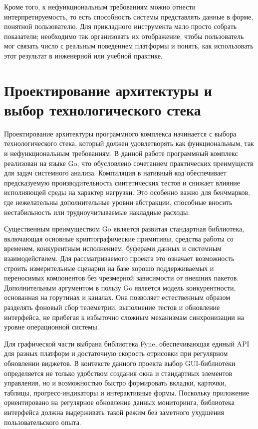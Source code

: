 Кроме того, к нефункциональным требованиям можно отнести интерпретируемость, то есть способность системы представлять данные в форме, понятной пользователю. Для прикладного инструмента мало просто собрать показатели; необходимо так организовать их отображение, чтобы пользователь мог связать число с реальным поведением платформы и понять, как использовать этот результат в инженерной или учебной практике.

\section{Проектирование архитектуры и выбор технологического стека}

Проектирование архитектуры программного комплекса начинается с выбора технологического стека, который должен удовлетворять как функциональным, так и нефункциональным требованиям. В данной работе программный комплекс реализован на языке Go, что обусловлено сочетанием практических преимуществ для задач системного анализа. Компиляция в нативный код обеспечивает предсказуемую производительность синтетических тестов и снижает влияние исполняющей среды на характер нагрузки. Это особенно важно для бенчмарков, где нежелательны дополнительные уровни абстракции, способные вносить нестабильность или трудноучитываемые накладные расходы.

Существенным преимуществом Go является развитая стандартная библиотека, включающая основные криптографические примитивы, средства работы со временем, конкурентным исполнением, буферами данных и системным взаимодействием. Для рассматриваемого проекта это означает возможность строить измерительные сценарии на базе хорошо поддерживаемых и переносимых компонентов без чрезмерной зависимости от внешних пакетов. Дополнительным аргументом в пользу Go является модель конкурентности, основанная на горутинах и каналах. Она позволяет естественным образом разделять фоновый сбор телеметрии, выполнение тестов и обновление интерфейса, не прибегая к избыточно сложным механизмам синхронизации на уровне операционной системы.

Для графической части выбрана библиотека Fyne, обеспечивающая единый API для разных платформ и достаточную скорость отрисовки при регулярном обновлении виджетов. В контексте данного проекта выбор GUI-библиотеки определяется не только удобством создания окна и стандартных элементов управления, но и возможностью быстро формировать вкладки, карточки, таблицы, прогресс-индикаторы и интерактивные формы. Поскольку приложение ориентировано на регулярное обновление данных мониторинга, библиотека интерфейса должна выдерживать такой режим без заметного ухудшения пользовательского опыта.

